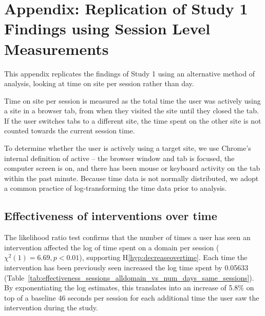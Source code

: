 \pagebreak

\section{Appendix: Replication of Study 1 Findings using Session Level Measurements}

This appendix replicates the findings of Study 1 using an alternative method of analysis, looking at time on site per session rather than day.

Time on site per session is measured as the total time the user was actively using a site in a browser tab, from when they visited the site until they closed the tab. If the user switches tabs to a different site, the time spent on the other site is not counted towards the current session time.

To determine whether the user is actively using a target site, we use Chrome's internal definition of active -- the browser window and tab is focused, the computer screen is on, and there has been mouse or keyboard activity on the tab within the past minute. 
Because time data is not normally distributed, we adopt a common practice of log-transforming the time data prior to analysis.


\subsection{Effectiveness of interventions over time}

The likelihood ratio test confirms that the number of times a user has seen an intervention affected the log of time spent on a domain per session ($\chi^{2}(1) = 6.69, p < 0.01$), supporting H\ref*{hyp:decreaseovertime}. Each time the intervention has been previously seen increased the log time spent by 0.05633 (Table~\ref{tab:effectiveness_sessions_alldomain_vs_num_days_same_sessions}). By exponentiating the log estimates, this translates into an increase of 5.8\% on top of a baseline 46 seconds per session for each additional time the user saw the intervention during the study. %

